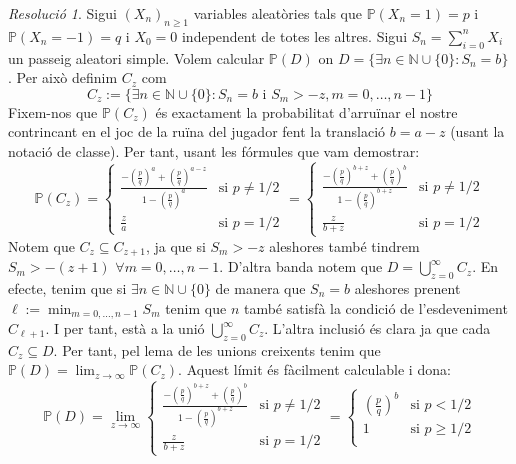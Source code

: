 \documentclass[10pt,a4paper]{article}
\newcommand{\NN}{\ensuremath{\mathbb{N}}} %
\newcommand{\Prob}{\ensuremath{\mathbb{P}}} %
\theoremstyle{definition}
\theoremstyle{remark}
\newtheorem*{res}{Resolució}
\begin{document}
\begin{res}
  Sigui $(X_n)_{n\geq 1}$ variables aleatòries tals que $\Prob(X_n=1)=p$ i $\Prob(X_n=-1)=q$ i $X_0=0$ independent de totes les altres. Sigui $S_n=\sum_{i=0}^n X_i$ un passeig aleatori simple. Volem calcular $\Prob(D)$ on $\displaystyle D=\{\exists n\in\NN \cup\{0\}:S_n=b\}$. Per això definim $C_z$ com $$C_z:=\{\exists n\in\NN\cup\{0\}:S_n=b\text{ i }S_m>-z,m=0,\ldots,n-1\}$$
  Fixem-nos que $\Prob(C_z)$ és exactament la probabilitat d'arruïnar el nostre contrincant en el joc de la ruïna del jugador fent la translació $b=a-z$ (usant la notació de classe). Per tant, usant les fórmules que vam demostrar:
  $$
    \Prob(C_z)=\begin{cases}
      \frac{-{\left(\frac{p}{q}\right)}^a+{\left(\frac{p}{q}\right)}^{a-z}}{1-{\left(\frac{p}{q}\right)}^a} & \text{si $p\ne 1/2$} \\
      \frac{z}{a}                                                                                           & \text{si $p= 1/2$}
    \end{cases}=\begin{cases}
      \frac{-{\left(\frac{p}{q}\right)}^{b+z}+{\left(\frac{p}{q}\right)}^{b}}{1-{\left(\frac{p}{q}\right)}^{b+z}} & \text{si $p\ne 1/2$} \\
      \frac{z}{b+z}                                                                                               & \text{si $p= 1/2$}
    \end{cases}
  $$
  Notem que $C_z\subseteq C_{z+1}$, ja que si $S_m>-z$ aleshores també tindrem $S_m>-(z+1)$ $\forall m=0,\ldots,n-1$. D'altra banda notem que $D=\bigcup_{z=0}^\infty C_z$. En efecte, tenim que si $\exists n\in\NN\cup\{0\}$ de manera que $S_n=b$ aleshores prenent $\ell:=\min_{m=0,\ldots,n-1}S_m$ tenim que $n$ també satisfà la condició de l'esdeveniment $C_{\ell+1}$. I per tant, està a la unió $\bigcup_{z=0}^\infty C_z$. L'altra inclusió és clara ja que cada $C_z\subseteq D$. Per tant, pel lema de les unions creixents tenim que $\displaystyle \Prob(D)=\lim_{z\to\infty}\Prob(C_z)$. Aquest límit és fàcilment calculable i dona:
  $$
    \Prob(D)=\lim_{z\to\infty}\begin{cases}
      \frac{-{\left(\frac{p}{q}\right)}^{b+z}+{\left(\frac{p}{q}\right)}^{b}}{1-{\left(\frac{p}{q}\right)}^{b+z}} & \text{si $p\ne 1/2$} \\
      \frac{z}{b+z}                                                                                               & \text{si $p= 1/2$}
    \end{cases}=\begin{cases}
      {\left(\frac{p}{q}\right)}^{b} & \text{si $p< 1/2$}    \\
      1                              & \text{si $p\geq 1/2$} \\
    \end{cases}
  $$
\end{res}
\end{document}
